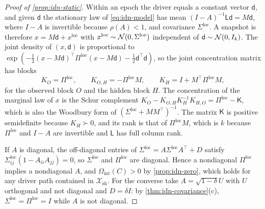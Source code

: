 \begin{proof}[Proof of \cref{prop:idn-static}]
Within an epoch the driver equals a constant vector $\mathsf d$, and given $\mathsf d$ the stationary law of \cref{eq:idn-model} has mean $(I-A)^{-1}\mathsf L\mathsf d=M\mathsf d$, where $I-A$ is invertible because $\rho(A)<1$, and covariance $\Sigma^{\mathrm{loc}}$. A snapshot is therefore $x=M\mathsf d+x^{\mathrm{loc}}$ with $x^{\mathrm{loc}}\sim\mathcal{N}(0,\Sigma^{\mathrm{loc}})$ independent of $\mathsf d\sim\mathcal{N}(0,I_k)$. The joint density of $(x,\mathsf d)$ is proportional to $\exp(-\tfrac12(x-M\mathsf d)^{\top}\Pi^{\mathrm{loc}}(x-M\mathsf d)-\tfrac12\mathsf d^{\top}\mathsf d)$, so the joint concentration matrix has blocks
\begin{equation}\label{eq:idn-blocks}
K_{O}=\Pi^{\mathrm{loc}},\qquad K_{O,H}=-\Pi^{\mathrm{loc}}M,\qquad K_{H}=I+M^{\top}\Pi^{\mathrm{loc}}M,
\end{equation}
for the observed block $O$ and the hidden block $H$. The concentration of the marginal law of $x$ is the Schur complement $K_O-K_{O,H}K_H^{-1}K_{H,O}=\Pi^{\mathrm{loc}}-\mathsf K$, which is also the Woodbury form of $(\Sigma^{\mathrm{loc}}+MM^{\top})^{-1}$. The matrix $\mathsf K$ is positive semidefinite because $K_H\succ0$, and its rank is that of $\Pi^{\mathrm{loc}}M$, which is $k$ because $\Pi^{\mathrm{loc}}$ and $I-A$ are invertible and $\mathsf L$ has full column rank.

If $A$ is diagonal, the off-diagonal entries of $\Sigma^{\mathrm{loc}}=A\Sigma^{\mathrm{loc}}A^{\top}+D$ satisfy $\Sigma^{\mathrm{loc}}_{ij}(1-A_{ii}A_{jj})=0$, so $\Sigma^{\mathrm{loc}}$ and $\Pi^{\mathrm{loc}}$ are diagonal. Hence a nondiagonal $\Pi^{\mathrm{loc}}$ implies a nondiagonal $A$, and $\Omega_{\mathrm{int}}(C)>0$ by \cref{prop:idn-zero}, which holds for any driver path contained in $\mathcal X_{\mathrm{sh}}$. For the converse take $A=\sqrt{1-\delta}U$ with $U$ orthogonal and not diagonal and $D=\delta I$: by \cref{thm:idn-covariance}(c), $\Sigma^{\mathrm{loc}}=\Pi^{\mathrm{loc}}=I$ while $A$ is not diagonal.
\end{proof}

